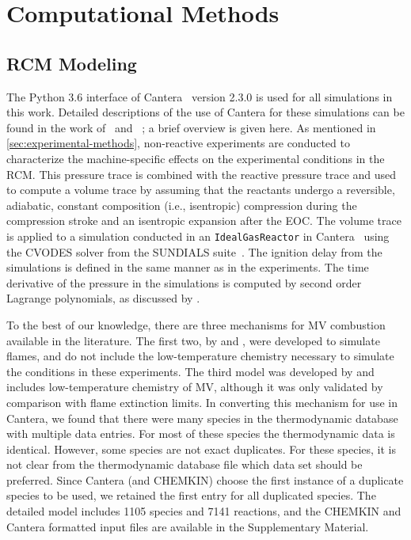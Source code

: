 \documentclass[letterpaper, review]{elsarticle}
\begin{document}
\section{Computational Methods}\label{sec:computational-methods}
\subsection{RCM Modeling}\label{sec:experimental-modeling}

The Python 3.6 interface of Cantera~\cite{cantera} version 2.3.0 is used for all simulations in this
work. Detailed descriptions of the use of Cantera for these simulations can be found in the work
of~\citet{Weber2016a} and~ \citet{Dames2016}; a brief overview is given here. As mentioned in
\cref{sec:experimental-methods}, non-reactive experiments are conducted to characterize the
machine-specific effects on the experimental conditions in the RCM. This pressure trace is combined
with the reactive pressure trace and used to compute a volume trace by assuming that the reactants
undergo a reversible, adiabatic, constant composition (i.e., isentropic) compression during the
compression stroke and an isentropic expansion after the EOC. The volume trace is applied to a
simulation conducted in an \verb|IdealGasReactor| in Cantera~\cite{cantera} using the CVODES
solver from the SUNDIALS suite~\cite{Hindmarsh2005}. The ignition delay from the simulations is
defined in the same manner as in the experiments. The time derivative of the pressure in the
simulations is computed by second order Lagrange polynomials, as discussed by \citet{Chapra2010}.

To the best of our knowledge, there are three mechanisms for MV combustion available in the
literature. The first two, by \cite{Korobeinichev2015} and \cite{Dmitriev2015}, were developed to
simulate flames, and do not include the low-temperature chemistry necessary to simulate the
conditions in these experiments. The third model was developed by \cite{Dievart2013} and includes
low-temperature chemistry of MV, although it was only validated by comparison with flame extinction
limits. In converting this mechanism for use in Cantera, we found that there were many species in the
thermodynamic database with multiple data entries. For most of these species the thermodynamic data
is identical. However, some species are not exact duplicates. For these species, it is not clear
from the thermodynamic database file which data set should be preferred. Since Cantera (and CHEMKIN)
choose the first instance of a duplicate species to be used, we retained the first entry for all
duplicated species. The detailed \cite{Dievart2013} model includes 1105 species and 7141 reactions,
and the CHEMKIN and Cantera formatted input files are available in the Supplementary Material.
\end{document}

